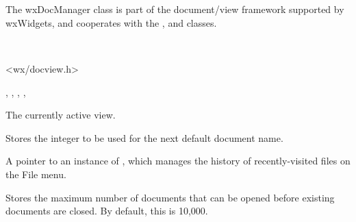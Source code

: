 \section{}\label{wxdocmanager}

The wxDocManager class is part of the document/view framework supported by wxWidgets,
and cooperates with the , \rtfsp
and  classes.


\\


<wx/docview.h>


, ,\rtfsp
{}, , 


\label{wxdocmanagermcreateview}


The currently active view.

\label{wxdocmanagermdefaultdocumentnamecounter}


Stores the integer to be used for the next default document name.

\label{wxdocmanagermfilehistory}


A pointer to an instance of ,
which manages the history of recently-visited files on the File menu.

\label{wxdocmanagermmaxdocsopen}


Stores the maximum number of documents that can be opened before
existing documents are closed. By default, this is 10,000.

\label{wxdocmanagermdocs}

